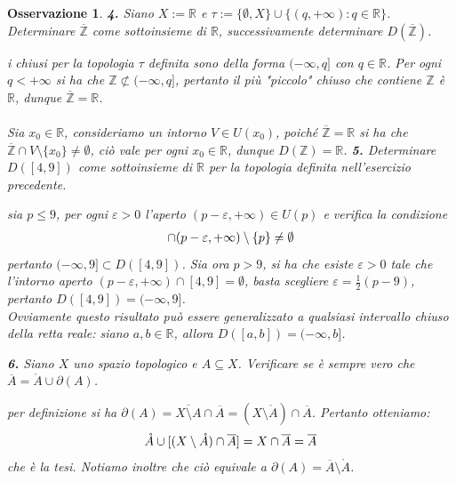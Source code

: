 \documentclass[oneside, 11pt]{amsbook}
\makeatletter
\newcommand{\0}{{(0)}}
\newcommand{\3}{{(3)}}
\theoremstyle{colonplain}
\theoremstyle{colondefinition}
\theoremstyle{colonremark}
\newtheorem{rmk}[thm]{Osservazione}
\numberwithin{equation}{chapter}
\renewcommand{\proofname}{Dimostrazione}
\renewenvironment{proof}[1][\proofname]{\par
  \pushQED{\end{proof}}%
  \normalfont \topsep6\p@\@plus6\p@\relax
  \trivlist
  \item[\hskip\labelsep\bfseries #1:]\ignorespaces
}{%
  \popQED\endtrivlist\@endpefalse
}
\makeatother
\begin{document}
\begin{rmk}
\textbf{4.} Siano $X := \mathbb{R}$ e $\tau := \{ \emptyset, X \} \cup \{ (q, +\infty) : q \in \mathbb{R} \}$. Determinare $\overline{\mathbb{Z}}$ come sottoinsieme di $\mathbb{R}$, successivamente determinare $D(\mathbb{\overline{Z}})$.
\begin{proof}[Soluzione]
i chiusi per la topologia $\tau$ definita sono della forma $(-\infty, q]$ con $q \in \mathbb{R}$. Per ogni $q < +\infty$ si ha che $\mathbb{Z} \not\subset (-\infty, q]$, pertanto il più "piccolo" chiuso che contiene $\mathbb{Z}$ è $\mathbb{R}$, dunque $\overline{\mathbb{Z}} = \mathbb{R}$. \\ \\
Sia $x_0 \in \mathbb{R}$, consideriamo un intorno $V \in U(x_0)$, poiché $\overline{\mathbb{Z}} = \mathbb{R}$ si ha che $\overline{\mathbb{Z}} \cap V \setminus \{ x_0 \} \neq \emptyset$, ciò vale per ogni $x_0 \in \mathbb{R}$, dunque $D(\mathbb{Z}) = \mathbb{R}$.
\end{proof}
\textbf{5.} Determinare $D([4, 9])$ come sottoinsieme di $\mathbb{R}$ per la topologia definita nell'esercizio precedente.
\begin{proof}[Soluzione] sia $p \leq 9$, per ogni $\varepsilon > 0$ l'aperto $(p - \varepsilon, +\infty) \in U(p)$ e verifica la condizione
\begin{align}
    [4, 9] \cap (p - \varepsilon, +\infty) \setminus \{ p \} \neq \emptyset \notag
\end{align}
pertanto $(-\infty, 9] \subset D([4, 9])$. Sia ora $p > 9$, si ha che esiste $\varepsilon > 0$ tale che l'intorno aperto $(p - \varepsilon, +\infty) \cap [4, 9] = \emptyset$, basta scegliere $\varepsilon = \frac{1}{2}(p - 9)$, pertanto $D([4, 9]) = (-\infty, 9]$. \\
Ovviamente questo risultato può essere generalizzato a qualsiasi intervallo chiuso della retta reale: siano $a, b \in \mathbb{R}$, allora $D([a, b]) = (-\infty, b]$.
\end{proof}

\textbf{6.} Siano $X$ uno spazio topologico e $A \subseteq X$. Verificare se è sempre vero che $\overline{A} = \mathring{A} \cup \partial(A)$.
\begin{proof}[Soluzione]
per definizione si ha $\partial(A) = \overline{X \setminus A} \cap \overline{A} = (X \setminus \mathring{A}) \cap \overline{A}$. Pertanto otteniamo:
\begin{align}
    \mathring{A} \cup [(X \setminus \mathring{A}) \cap \overline{A}] = X \cap \overline{A} = \overline{A} \notag
\end{align}
che è la tesi. Notiamo inoltre che ciò equivale a $\partial(A) = \overline{A} \setminus \mathring{A}$.
\end{proof}


\end{rmk}
\end{document}
